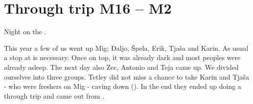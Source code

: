 \section{Through trip M16 -- M2}

\begin{marginfigure}
\checkoddpage \ifoddpage \forcerectofloat \else \forceversofloat \fi
\centering
 \caption{Night on the . }
 \label{plataeu moon}
\end{marginfigure}





This year a few of us went up Mig; Đaljo, Špela, Erik, Tjaša and Karin.
As usual a stop at  is necessary. Once on top, it was already dark
and most peoples were already asleep. The next day also Zec, Antonio
and Teja came up. We divided ourselves into three groups. Tetley did not
miss a chance to take Karin and Tjaša - who were freshers on Mig - caving
down  (). In the end they ended up doing a
through trip and came out from .

